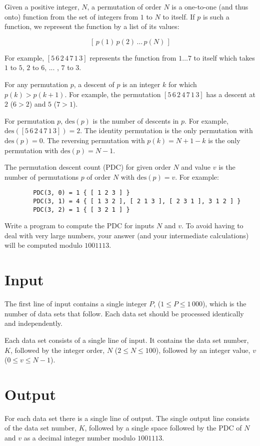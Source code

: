 
Given a positive integer, $N$, a permutation of order $N$ is a one-to-one (and thus onto) function from the
set of integers from $1$ to $N$ to itself. If $p$ is such a function, we represent the function by a list of its
values:

\[
[ \, p(1) \, p(2) \, \ldots \, p(N) \, ]
\]

For example,
$[5 \, 6 \, 2 \, 4 \, 7 \, 1 \, 3]$ represents the function from ${ 1 \ldots 7 }$ to itself which takes $1$ to $5$, $2$ to $6$, ... , $7$ to $3$.

For any permutation $p$, a descent of $p$ is an integer $k$ for which $p(k) > p(k+1)$. For example, the
permutation $[5 \, 6 \, 2 \, 4 \, 7 \, 1 \, 3]$ has a descent at $2$ ($6 > 2$) and $5$ ($7 > 1$).

For permutation $p$, $\text{des}(p)$ is the number of descents in $p$. For example, $\text{des}([5 \, 6 \, 2 \, 4 \, 7 \, 1 \, 3]) = 2$. 
The identity permutation is the only permutation with $\text{des}(p) = 0$. The reversing permutation with
$p(k) = N + 1 - k$ is the only permutation with $\text{des}(p) = N - 1$.

The permutation descent count (PDC) for given order $N$ and value $v$ is the number of permutations $p$
of order $N$ with $\text{des}(p) = v$. For example:

\begin{verbatim}
        PDC(3, 0) = 1 { [ 1 2 3 ] }
        PDC(3, 1) = 4 { [ 1 3 2 ], [ 2 1 3 ], [ 2 3 1 ], 3 1 2 ] }
        PDC(3, 2) = 1 { [ 3 2 1 ] }
\end{verbatim}

Write a program to compute the PDC for inputs $N$ and $v$. To avoid having to deal with very large
numbers, your answer (and your intermediate calculations) will be computed modulo $1001113$.

\section*{Input}

The first line of input contains a single integer $P$, ($1 \le P \le 1\,000$), which is the number of data sets that
follow. Each data set should be processed identically and independently.

Each data set consists of a single line of input. It contains the data set number, $K$, 
followed by the integer order, $N$ ($2 \le N \le 100$), followed by an integer value, $v$ ($0 \le v \le N-1$).

\section*{Output}

For each data set there is a single line of output. The single output line consists of the data set
number, $K$, followed by a single space followed by the PDC of $N$ and $v$ as a decimal integer number 
modulo $1001113$.

